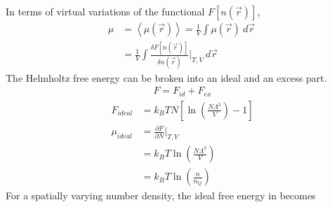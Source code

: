 \documentclass[double,12pt]{revtex4-2}
\begin{document}
In terms of virtual variations of the functional $F[n(\vec r)]$, 
\begin{align}
    \mu &= \left<\mu(\vec r)\right> = \frac{1}{V}\int \mu(\vec r)~d\vec r~\\
        &= \frac{1}{V} \int \frac{\delta F[n(\vec r)]}{\delta n(\vec r)}
           \bigg|_{T,V}~d\vec r~  
\end{align}
The Helmholtz free energy can be broken into an ideal and an excess part.
\begin{align}
    F = F_{id}+ F_{ex}
\end{align} 
\begin{align}
   F_{ideal}  &= k_BTN[\ln\left(\frac{N\Lambda^{3}}{V}\right)-1]  \\
%
  \mu_{ideal} &= \frac{\partial F}{\partial N}\bigg|_{T,V}   \\
              &= k_BT\ln\left(\frac{N\Lambda^{3}}{V}\right)  \\
              &= k_BT\ln\left(\frac{n}{n_Q}\right)
\end{align} 
For a spatially varying number density, the ideal free energy in becomes
\end{document}
